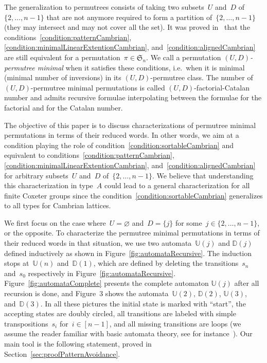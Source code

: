 \documentclass[11pt]{article}
\theoremstyle{definition}
\providecommand{\ie}{i.e.\ }
\numberwithin{equation}{section}
\newcommand{\fS}{\mathfrak{S}}
\newcommand{\defn}[1]{\textsl{\color{darkblue} #1}}
\newcommand{\automatonU}{\mathbb{U}}
\newcommand{\automatonD}{\mathbb{D}}
\begin{document}
The generalization to permutrees consists of taking two subsets~$U$ and~$D$ of~$\{2, \dots, n-1\}$ that are not anymore required to form a partition of~$\{2, \dots, n-1\}$ (they may intersect and may not cover all the set).
It was proved in~\cite{PilaudPons-permutrees, ChatelPilaudPons} that the conditions~\ref{condition:patternCambrian}, \ref{condition:minimalLinearExtentionCambrian}, and~\ref{condition:alignedCambrian} are still equivalent for a permutation~$\pi \in \fS_n$.
We call a permutation \defn{$(U,D)$-permutree minimal} when it satisfies these conditions, \ie when it is minimal (minimal number of inversions) in its $(U,D)$-permutree class.
The number of $(U,D)$-permutree minimal permutations is called $(U,D)$-factorial-Catalan number and admits recursive formulae interpolating between the formulae for the factorial and for the Catalan number.

The objective of this paper is to discuss characterizations of permutree minimal permutations in terms of their reduced words.
In other words, we aim at a condition playing the role of condition~\ref{condition:sortableCambrian} and equivalent to conditions~\ref{condition:patternCambrian}, \ref{condition:minimalLinearExtentionCambrian}, and~\ref{condition:alignedCambrian} for arbitrary subsets~$U$ and~$D$ of~$\{2, \dots, n-1\}$.
We believe that understanding this characterization in type~$A$ could lead to a general characterization for all finite Coxeter groups since the condition~\ref{condition:sortableCambrian} generalizes to all types for Cambrian lattices.

We first focus on the case where~$U = \varnothing$ and~$D = \{j\}$ for some~${j \in \{2, \dots, n-1\}}$, or the opposite.
To characterize the permutree minimal permutations in terms of their reduced words in that situation, we use two automata~$\automatonU(j)$ and $\automatonD(j)$ defined inductively as shown in Figure~\ref{fig:automataRecursive}.
The induction stops at~$\automatonU(n)$ and~$\automatonD(1)$, which are defined by deleting the transitions~$s_n$ and~$s_0$ respectively in Figure~\ref{fig:automataRecursive}.
Figure~\ref{fig:automataComplete} presents the complete automaton $\automatonU(j)$ after all recursion is done, and Figure~3 shows the automata~$\automatonU(2)$, $\automatonD(2)$, $\automatonU(3)$, and~$\automatonD(3)$.
In all these pictures the initial state is marked with ``start'', the accepting states are doubly circled, all transitions are labeled with simple transpositions~$s_i$ for~$i \in [n-1]$, and all missing transitions are loops (we assume the reader familiar with basic automata theory, see for instance~\cite{HopcroftUllman}).
Our main tool is the following statement, proved in Section~\ref{sec:proofPatternAvoidance}.
\end{document}

